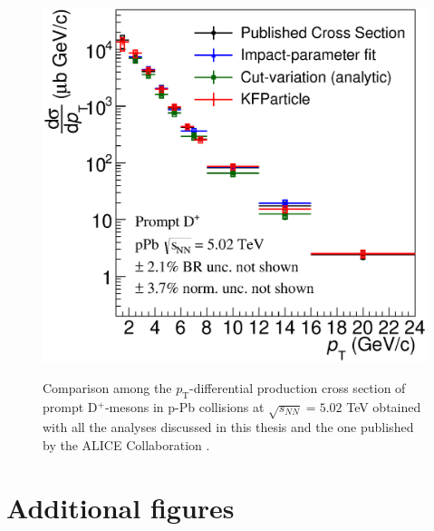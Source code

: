 \documentclass[b5paper,10pt,twoside,oldstyle,classica]{toptesi}
\newcommand{\pt}{p_\text{T}}
\begin{document}
\begin{figure}[tb]
\begin{center}
{\includegraphics[scale = 0.45]{CrossSecComp.eps}}
\caption{Comparison among the $\pt$-differential production cross section of prompt D$^+$-mesons in p-Pb collisions at $\sqrt{s_{NN}}=5.02$ TeV obtained with all the analyses discussed in this thesis and the one published by the ALICE Collaboration \cite{Abelev:2014hha}.}
\label{results_comp}
\end{center}
\end{figure} 
\appendix
\chapter{Additional figures}
\clearpage
\end{document}
